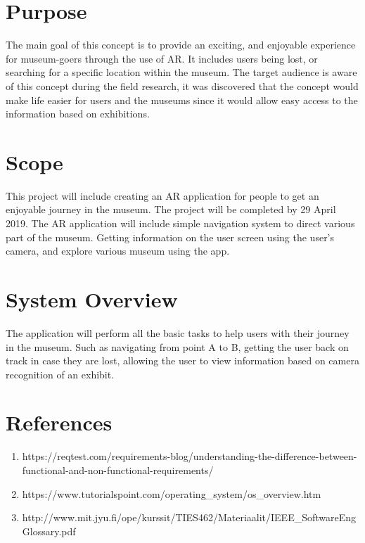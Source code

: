 
\section{Purpose}
The main goal of this concept is to provide an exciting, and enjoyable experience for museum-goers through the use of AR. It includes users being lost, or searching for a specific location within the museum. The target audience is aware of this concept during the field research, it was discovered that the concept would make life easier for users and the museums since it would allow easy access to the information based on exhibitions.

\section{Scope}
This project will include creating an AR application for people to get an enjoyable journey in the museum. The project will be completed by 29 April 2019. The AR application will include simple navigation system to direct various part of the museum. Getting information on the user screen using the user's camera, and explore various museum using the app. 

\section{System Overview}
The application will perform all the basic tasks to help users with their journey in the museum. Such as navigating from point A to B, getting the user back on track in case they are lost, allowing the user to view information based on camera recognition of an exhibit.

\section{References}
\begin{enumerate}
    \item https://reqtest.com/requirements-blog/understanding-the-difference-between-functional-and-non-functional-requirements/
    \item https://www.tutorialspoint.com/operating_system/os_overview.htm
    \item http://www.mit.jyu.fi/ope/kurssit/TIES462/Materiaalit/IEEE_SoftwareEngGlossary.pdf
\end{enumerate}

